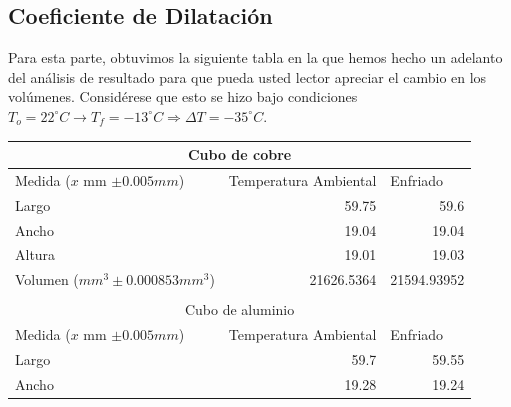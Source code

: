 \documentclass{article}
\begin{document}
\subsection{Coeficiente de Dilatación}

Para esta parte, obtuvimos la siguiente tabla en la que hemos hecho un adelanto del análisis de resultado para que pueda usted lector apreciar el cambio en los volúmenes. Considérese que esto se hizo bajo condiciones $T_o = 22^{\circ}C \rightarrow T_f = -13^{\circ}C \Rightarrow \Delta T = -35^{\circ}C$.

\begin{table}[h]
\centering
\begin{tabular}{lrr}
\hline
\multicolumn{3}{|c|}{Cubo de cobre}                                                                                                      \\ \hline
\multicolumn{1}{|l|}{Medida ($x$ mm $\pm 0.005mm$)}      & \multicolumn{1}{l|}{Temperatura Ambiental} & \multicolumn{1}{l|}{Enfriado}    \\ \hline
\multicolumn{1}{|l|}{Largo}                              & \multicolumn{1}{r|}{59.75}                 & \multicolumn{1}{r|}{59.6}        \\ \hline
\multicolumn{1}{|l|}{Ancho}                              & \multicolumn{1}{r|}{19.04}                 & \multicolumn{1}{r|}{19.04}       \\ \hline
\multicolumn{1}{|l|}{Altura}                             & \multicolumn{1}{r|}{19.01}                 & \multicolumn{1}{r|}{19.03}       \\ \hline
\multicolumn{1}{|l|}{Volumen ($mm^3 \pm 0.000853mm^3$)}  & \multicolumn{1}{r|}{21626.5364}            & \multicolumn{1}{r|}{21594.93952} \\ \hline
                                                         & \multicolumn{1}{l}{}                       & \multicolumn{1}{l}{}             \\ \hline
\multicolumn{3}{|c|}{Cubo de aluminio}                                                                                                   \\ \hline
\multicolumn{1}{|l|}{Medida ($x$ mm $\pm 0.005mm$)}      & \multicolumn{1}{l|}{Temperatura Ambiental} & \multicolumn{1}{l|}{Enfriado}    \\ \hline
\multicolumn{1}{|l|}{Largo}                              & \multicolumn{1}{r|}{59.7}                  & \multicolumn{1}{r|}{59.55}       \\ \hline
\multicolumn{1}{|l|}{Ancho}                              & \multicolumn{1}{r|}{19.28}                 & \multicolumn{1}{r|}{19.24}       \\ \hline

\end{tabular}
\end{table}
\end{document}
